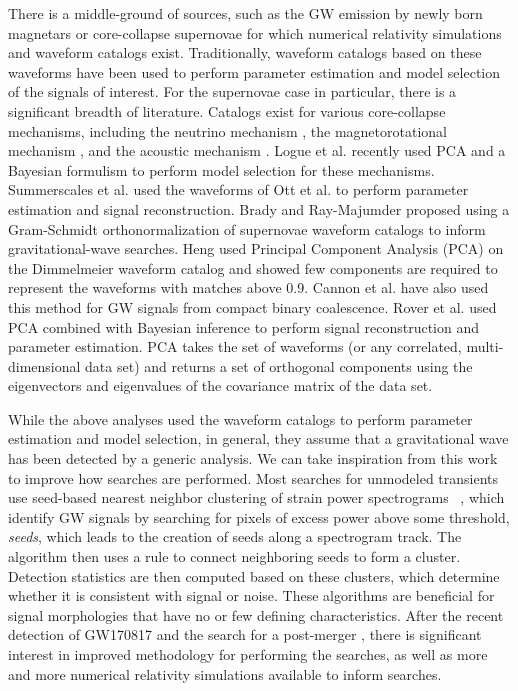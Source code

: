 \documentclass[prd,showpacs,superscriptaddress,twocolumn,
floatfix,preprintnumbers,altaffilletter]{revtex4}
\begin{document}
There is a middle-ground of sources, such as the GW emission by newly born magnetars \cite{StDa2005,SiRo2007,DaSh2009,GiPe2013,DaGi2015} or core-collapse supernovae \cite{Ott2009} for which numerical relativity simulations and waveform catalogs exist. 
Traditionally, waveform catalogs based on these waveforms have been used to perform parameter estimation and model selection of the signals of interest.
For the supernovae case in particular, there is a significant breadth of literature. 
Catalogs exist for various core-collapse mechanisms, including the neutrino mechanism \cite{Jan2012}, the magnetorotational mechanism \cite{BuDe2007}, and the acoustic mechanism \cite{BuLi2006}. 
Logue et al. \cite{LoOt2012} recently used PCA and a Bayesian formulism to perform model selection for these mechanisms.
Summerscales et al. \cite{SuBu2008} used the waveforms of Ott et al. \cite{OtBu2004} to perform parameter estimation and signal reconstruction.
Brady and Ray-Majumder \cite{BrRa2004} proposed using a Gram-Schmidt orthonormalization of supernovae waveform catalogs to inform gravitational-wave searches.
Heng \cite{Sio2009} used Principal Component Analysis (PCA) on the Dimmelmeier \cite{DiOt2008} waveform catalog and showed few components are required to represent the waveforms with matches above 0.9.
Cannon et al. \cite{CaCh2010} have also used this method for GW signals from compact binary coalescence.
Rover et al. \cite{RoBi2009} used PCA combined with Bayesian inference to perform signal reconstruction and parameter estimation.
PCA takes the set of waveforms (or any correlated, multi-dimensional data set) and returns a set of orthogonal components using the eigenvectors and eigenvalues of the covariance matrix of the data set.

While the above analyses used the waveform catalogs to perform parameter estimation and model selection, in general, they assume that a gravitational wave has been detected by a generic analysis.
We can take inspiration from this work to improve how searches are performed.
Most searches for unmodeled transients use seed-based nearest neighbor clustering of strain power spectrograms ~\cite{ThCo2013}, which identify GW signals by searching for pixels of excess power above some threshold, {\em seeds}, which leads to the creation of seeds along a spectrogram track.
The algorithm then uses a rule to connect neighboring seeds to form a cluster.
Detection statistics are then computed based on these clusters, which determine whether it is consistent with signal or noise.
These algorithms are beneficial for signal morphologies that have no or few defining characteristics.
After the recent detection of GW170817 and the search for a post-merger \cite{AbEA2017h}, there is significant interest in improved methodology for performing the searches, as well as more and more numerical relativity simulations available to inform searches.
\end{document}
